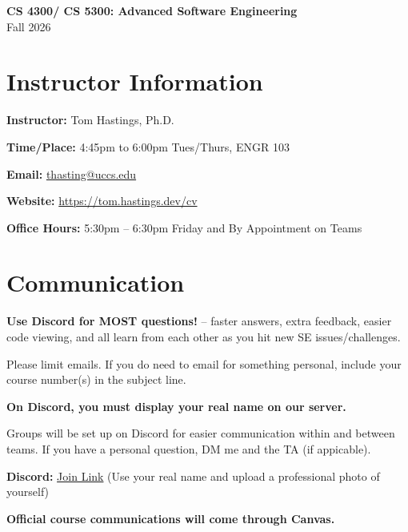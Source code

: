 \documentclass[11pt]{article}
\begin{document}
\begin{center}
{\LARGE \textbf{CS 4300/ CS 5300: Advanced Software Engineering}}\\[0.5em]
{\large Fall 2026}
\end{center}

\section*{Instructor Information}

\textbf{Instructor:} Tom Hastings, Ph.D.

\textbf{Time/Place:} 4:45pm to 6:00pm Tues/Thurs, ENGR 103

\textbf{Email:} \href{mailto:thasting@uccs.edu}{thasting@uccs.edu}

\textbf{Website:} \url{https://tom.hastings.dev/cv}

\textbf{Office Hours:} 5:30pm -- 6:30pm Friday and By Appointment on Teams





\section*{Communication}

\textbf{Use Discord for MOST questions!} -- faster answers, extra feedback, easier code viewing, and all learn from each other as you hit new SE issues/challenges.

Please limit emails. If you do need to email for something personal, include your course number(s) in the subject line.

\textbf{On Discord, you must display your real name on our server.}

Groups will be set up on Discord for easier communication within and between teams. If you have a personal question, DM me and the TA (if appicable).

\textbf{Discord:} 
\href{https://discord.gg/aRHqvkXNH7}{Join Link} (Use your real name and upload a professional photo of yourself)

\textbf{Official course communications will come through Canvas.}
\end{document}
